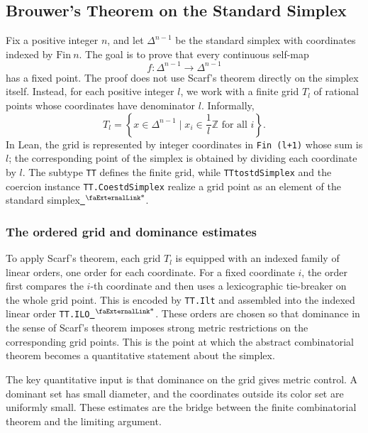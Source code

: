 \documentclass{article}
\theoremstyle{definition}
\newcommand{\extlink}{~\ensuremath{{}^\text{\faExternalLink*}}}
\begin{document}
\subsection{Brouwer's Theorem on the Standard Simplex}\label{subsec:brouwer-standard}

Fix a positive integer $n$, and let $\Delta^{n-1}$ be the standard simplex with coordinates indexed by $\mathrm{Fin}\ n$. The goal is to prove that every continuous self-map
$$
f : \Delta^{n-1} \to \Delta^{n-1}
$$
has a fixed point. The proof does not use Scarf's theorem directly on the simplex itself. Instead, for each positive integer $l$, we work with a finite grid $T_l$ of rational points whose coordinates have denominator $l$. Informally,
$$
T_l =
\left\{
  x \in \Delta^{n-1}
  \mid
  x_i \in \frac{1}{l}\mathbb{Z}
  \text{ for all } i
\right\}.
$$
In Lean, the grid is represented by integer coordinates in \verb|Fin (l+1)| whose sum is $l$; the corresponding point of the simplex is obtained by dividing each coordinate by $l$. The subtype \verb|TT| defines the finite grid, while \verb|TTtostdSimplex| and the coercion instance \verb|TT.CoestdSimplex| realize a grid point as an element of the standard simplex\href{https://github.com/Solo-ary/Game-Theory-Formalization/blob/7b49d5267d4f26b17bdf071250880b63e96999b6/Brouwer/Gametheory/Brouwer.lean#L16-L50}{\extlink}.

\subsubsection{The ordered grid and dominance estimates}

To apply Scarf's theorem, each grid $T_l$ is equipped with an indexed family of linear orders, one order for each coordinate. For a fixed coordinate $i$, the order first compares the $i$-th coordinate and then uses a lexicographic tie-breaker on the whole grid point. This is encoded by \verb|TT.Ilt| and assembled into the indexed linear order \verb|TT.ILO|\href{https://github.com/Solo-ary/Game-Theory-Formalization/blob/7b49d5267d4f26b17bdf071250880b63e96999b6/Brouwer/Gametheory/Brouwer.lean#L53-L76}{\extlink}. These orders are chosen so that dominance in the sense of Scarf's theorem imposes strong metric restrictions on the corresponding grid points. This is the point at which the abstract combinatorial theorem becomes a quantitative statement about the simplex.

The key quantitative input is that dominance on the grid gives metric control. A dominant set has small diameter, and the coordinates outside its color set are uniformly small. These estimates are the bridge between the finite combinatorial theorem and the limiting argument.
\end{document}
